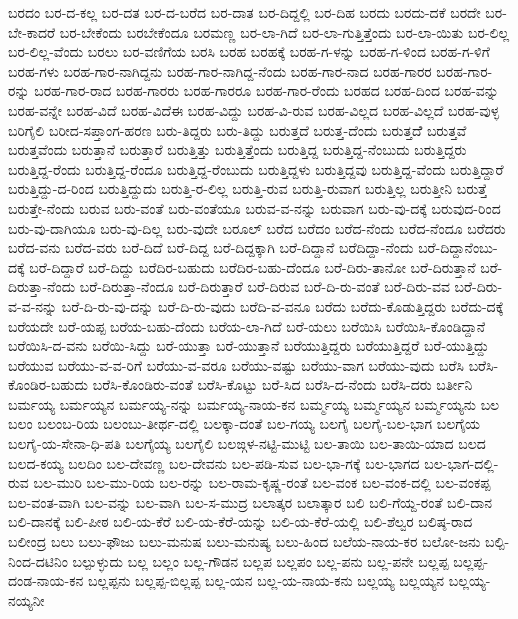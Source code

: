 ಬರದಂ
ಬರ-ದ-ಕಲ್ಲ
ಬರ-ದತ
ಬರ-ದ-ಬರೆದ
ಬರ-ದಾತ
ಬರ-ದಿದ್ದಲ್ಲಿ
ಬರ-ದಿಹ
ಬರದು
ಬರದು-ದಕೆ
ಬರದೇ
ಬರ-ಬೇ-ಕಾದರೆ
ಬರ-ಬೇಕೆಂದು
ಬರಬೇಕೆಂದೂ
ಬರಮಣ್ಣ
ಬರ-ಲಾ-ಗಿದೆ
ಬರ-ಲಾ-ಗುತ್ತಿತ್ತೆಂದು
ಬರ-ಲಾ-ಯಿತು
ಬರ-ಲಿಲ್ಲ
ಬರ-ಲಿಲ್ಲ-ವೆಂದು
ಬರಲು
ಬರ-ವಣಿಗೆಯ
ಬರಸಿ
ಬರಹ
ಬರಹಕ್ಕೆ
ಬರಹ-ಗ-ಳನ್ನು
ಬರಹ-ಗ-ಳಿಂದ
ಬರಹ-ಗ-ಳಿಗೆ
ಬರಹ-ಗಳು
ಬರಹ-ಗಾರ-ನಾಗಿದ್ದನು
ಬರಹ-ಗಾರ-ನಾಗಿದ್ದ-ನೆಂದು
ಬರಹ-ಗಾರ-ನಾದ
ಬರಹ-ಗಾರರ
ಬರಹ-ಗಾರ-ರನ್ನು
ಬರಹ-ಗಾರ-ರಾದ
ಬರಹ-ಗಾರರು
ಬರಹ-ಗಾರರೂ
ಬರಹ-ಗಾರ-ರೆಂದು
ಬರಹದ
ಬರಹ-ದಿಂದ
ಬರಹ-ವನ್ನು
ಬರಹ-ವನ್ನೇ
ಬರಹ-ವಿದೆ
ಬರಹ-ವಿದೆಈ
ಬರಹ-ವಿದ್ದು
ಬರಹ-ವಿ-ರುವ
ಬರಹ-ವಿಲ್ಲದ
ಬರಹ-ವಿಲ್ಲದೆ
ಬರಹ-ವುಳ್ಳ
ಬರಿಗೈಲಿ
ಬರೀದ-ಸಪ್ತಾಂಗ-ಹರಣ
ಬರು-ತಿದ್ದರು
ಬರು-ತಿದ್ದು
ಬರುತ್ತದೆ
ಬರುತ್ತ-ದೆಂದು
ಬರುತ್ತದೆೆ
ಬರುತ್ತವೆ
ಬರುತ್ತವೆಂದು
ಬರುತ್ತಾನೆ
ಬರುತ್ತಾರೆ
ಬರುತ್ತಿತ್ತು
ಬರುತ್ತಿತ್ತೆಂದು
ಬರುತ್ತಿದ್ದ
ಬರುತ್ತಿದ್ದ-ನೆಂಬುದು
ಬರುತ್ತಿದ್ದರು
ಬರುತ್ತಿದ್ದ-ರೆಂದು
ಬರುತ್ತಿದ್ದ-ರೆಂದೂ
ಬರುತ್ತಿದ್ದ-ರೆಂಬುದು
ಬರುತ್ತಿದ್ದಳು
ಬರುತ್ತಿದ್ದವು
ಬರುತ್ತಿದ್ದ-ವೆಂದು
ಬರುತ್ತಿದ್ದಾರೆ
ಬರುತ್ತಿದ್ದು-ದ-ರಿಂದ
ಬರುತ್ತಿದ್ದುದು
ಬರುತ್ತಿ-ರ-ಲಿಲ್ಲ
ಬರುತ್ತಿ-ರುವ
ಬರುತ್ತಿ-ರುವಾಗ
ಬರುತ್ತಿಲ್ಲ
ಬರುತ್ತೀನಿ
ಬರುತ್ತೆ
ಬರುತ್ತೇ-ನೆಂದು
ಬರುವ
ಬರು-ವಂತೆ
ಬರು-ವಂತೆಯೂ
ಬರುವ-ವ-ನನ್ನು
ಬರುವಾಗ
ಬರು-ವು-ದಕ್ಕೆ
ಬರುವುದ-ರಿಂದ
ಬರು-ವು-ದಾಗಿಯೂ
ಬರು-ವು-ದಿಲ್ಲ
ಬರು-ವುದೇ
ಬರೂಲ್
ಬರೆದ
ಬರೆದಂ
ಬರೆದ-ನೆಂದು
ಬರೆದ-ನೆಂದೂ
ಬರೆದರು
ಬರೆದ-ವನು
ಬರೆದ-ವರು
ಬರೆ-ದಿದೆ
ಬರೆ-ದಿದ್ದ
ಬರೆ-ದಿದ್ದಕ್ಕಾಗಿ
ಬರೆ-ದಿದ್ದಾನೆ
ಬರೆದಿದ್ದಾ-ನೆಂದು
ಬರೆ-ದಿದ್ದಾನೆಂಬು-ದಕ್ಕೆ
ಬರೆ-ದಿದ್ದಾರೆ
ಬರೆ-ದಿದ್ದು
ಬರೆದಿರ-ಬಹುದು
ಬರೆದಿರ-ಬಹು-ದೆಂದೂ
ಬರೆ-ದಿರು-ತಾನೋ
ಬರೆ-ದಿರುತ್ತಾನೆ
ಬರೆ-ದಿರುತ್ತಾ-ನೆಂದು
ಬರೆ-ದಿರುತ್ತಾ-ನೆಂದೂ
ಬರೆ-ದಿರುತ್ತಾರೆ
ಬರೆ-ದಿರುವ
ಬರೆ-ದಿ-ರು-ವಂತೆ
ಬರೆ-ದಿರು-ವವ
ಬರೆ-ದಿರು-ವ-ವ-ನನ್ನು
ಬರೆ-ದಿ-ರು-ವು-ದನ್ನು
ಬರೆ-ದಿ-ರು-ವುದು
ಬರೆದಿ-ವ-ವನೂ
ಬರೆದು
ಬರೆದು-ಕೊಡುತ್ತಿದ್ದರು
ಬರೆದು-ದಕ್ಕೆ
ಬರೆಯದೇ
ಬರೆ-ಯಪ್ಪ
ಬರೆಯ-ಬಹು-ದೆಂದು
ಬರೆಯ-ಲಾ-ಗಿದೆ
ಬರೆ-ಯಲು
ಬರೆಯಿಸಿ
ಬರೆಯಿಸಿ-ಕೊಂಡಿದ್ದಾನೆ
ಬರೆಯಿಸಿ-ದ-ವನು
ಬರೆಯಿ-ಸಿದ್ದು
ಬರೆ-ಯುತ್ತಾ
ಬರೆ-ಯುತ್ತಾನೆ
ಬರೆಯುತ್ತಿದ್ದರು
ಬರೆಯುತ್ತಿದ್ದರೆ
ಬರೆ-ಯುತ್ತಿದ್ದು
ಬರೆಯುವ
ಬರೆಯು-ವ-ವ-ರಿಗೆ
ಬರೆಯು-ವ-ವರೂ
ಬರೆಯು-ವಷ್ಟು
ಬರೆಯು-ವಾಗ
ಬರೆಯು-ವುದು
ಬರೆಸಿ
ಬರೆಸಿ-ಕೊಂಡಿರ-ಬಹುದು
ಬರೆಸಿ-ಕೊಂಡಿರು-ವಂತೆ
ಬರೆಸಿ-ಕೊಟ್ಟು
ಬರೆ-ಸಿದ
ಬರೆಸಿ-ದ-ನೆಂದು
ಬರೆಸಿ-ದರು
ಬರ್ತೀನಿ
ಬರ್ಮಯ್ಯ
ಬರ್ಮಯ್ಯನ
ಬರ್ಮಯ್ಯ-ನನ್ನು
ಬರ್ಮಯ್ಯ-ನಾಯ-ಕನ
ಬರ್ಮ್ಮಯ್ಯ
ಬರ್ಮ್ಮಯ್ಯನ
ಬರ್ಮ್ಮಯ್ಯನು
ಬಲ
ಬಲಂ
ಬಲಂಬ-ರಿಯ
ಬಲಂಬು-ತೀರ್ಥ-ದಲ್ಲಿ
ಬಲಕ್ಕಾ-ದಂತೆ
ಬಲ-ಗಯ್ಯ
ಬಲಗೈ
ಬಲಗೈ-ಬಲ-ಭಾಗ
ಬಲಗೈಯ
ಬಲಗೈ-ಯ-ಸೇನಾ-ಧಿ-ಪತಿ
ಬಲಗೈಯ್ಯ
ಬಲಗೈಲಿ
ಬಲಙ್ಗಳ-ನಟ್ಟಿ-ಮುಟ್ಟಿ
ಬಲ-ತಾಯಿ
ಬಲ-ತಾಯಿ-ಯಾದ
ಬಲದ
ಬಲದ-ಕಯ್ಯ
ಬಲದಿಂ
ಬಲ-ದೇವಣ್ಣ
ಬಲ-ದೇವನು
ಬಲ-ಪಡಿ-ಸುವ
ಬಲ-ಭಾ-ಗಕ್ಕೆ
ಬಲ-ಭಾಗದ
ಬಲ-ಭಾಗ-ದಲ್ಲಿ-ರುವ
ಬಲ-ಮುರಿ
ಬಲ-ಮು-ರಿಯ
ಬಲ-ರನ್ನು
ಬಲ-ರಾಮ-ಕೃಷ್ಣ-ರಂತೆ
ಬಲ-ವಂಕ
ಬಲ-ವಂಕ-ದಲ್ಲಿ
ಬಲ-ವಂಕಪ್ಪ
ಬಲ-ವಂತ-ವಾಗಿ
ಬಲ-ವನ್ನು
ಬಲ-ವಾಗಿ
ಬಲ-ಸ-ಮುದ್ರ
ಬಲಾತ್ಕರ
ಬಲಾತ್ಕಾರ
ಬಲಿ
ಬಲಿ-ಗೆಯ್ದ-ರಂತೆ
ಬಲಿ-ದಾನ
ಬಲಿ-ದಾನಕ್ಕೆ
ಬಲಿ-ಪೀಠ
ಬಲಿ-ಯ-ಕೆರೆ
ಬಲಿ-ಯ-ಕೆರೆ-ಯನ್ನು
ಬಲಿ-ಯ-ಕೆರೆ-ಯಲ್ಲಿ
ಬಲಿ-ಶೆಲ್ವರ
ಬಲಿಷ್ಠ-ರಾದ
ಬಲೀಂದ್ರ
ಬಲು
ಬಲು-ಫೌಜು
ಬಲು-ಮನುಷ
ಬಲು-ಮನುಷ್ಯ
ಬಲು-ಹಿಂದ
ಬಲೆಯ-ನಾಯ-ಕರ
ಬಲೋ-ಜನು
ಬಲ್ಪಿ-ನಿಂದ-ದಟಿನಿಂ
ಬಲ್ಪುಳ್ಳುದು
ಬಲ್ಲ
ಬಲ್ಲಂ
ಬಲ್ಲ-ಗೌಡನ
ಬಲ್ಲಪ
ಬಲ್ಲಪಂ
ಬಲ್ಲ-ಪನು
ಬಲ್ಲ-ಪನೇ
ಬಲ್ಲಪ್ಪ
ಬಲ್ಲಪ್ಪ-ದಂಡ-ನಾಯ-ಕನ
ಬಲ್ಲಪ್ಪನು
ಬಲ್ಲಪ್ಪ-ಬಿಲ್ಲಪ್ಪ
ಬಲ್ಲ-ಯನ
ಬಲ್ಲ-ಯ-ನಾಯ-ಕನು
ಬಲ್ಲಯ್ಯ
ಬಲ್ಲಯ್ಯನ
ಬಲ್ಲಯ್ಯ-ನಯ್ಯನೀ
